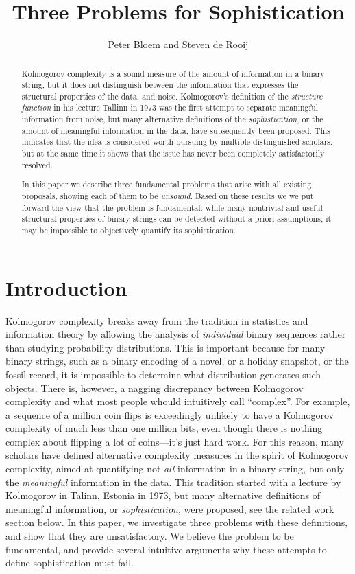 \documentclass{style/llncs}
\title{Three Problems for Sophistication}
\author{Peter Bloem and Steven de Rooij}
\institute{
  System and Network Engineering Group, \\University of Amsterdam, the Netherlands\\
  \email{uva@peterbloem.nl, steven.de.rooij@gmail.com}
}
\begin{document}
\maketitle

\begin{abstract}
Kolmogorov complexity is a sound measure of the amount of information in a binary string, but it does not distinguish between the information that expresses the structural properties of the data, and noise. Kolmogorov's definition of the \emph{structure function} in his lecture Tallinn in 1973 was the first attempt to separate meaningful information from noise, but many alternative definitions of the \emph{sophistication}, or the amount of meaningful information in the data, have subsequently been proposed. This indicates that the idea is considered worth pursuing by multiple distinguished scholars, but at the same time it shows that the issue has never been completely satisfactorily resolved.

In this paper we describe three fundamental problems that arise with all existing proposals, showing each of them to be \emph{unsound}. Based on these results we we put forward the view that the problem is fundamental: while many nontrivial and useful structural properties of binary strings can be detected without a priori assumptions, it may be impossible to objectively quantify its sophistication.
\end{abstract}

\section{Introduction}

Kolmogorov complexity breaks away from the tradition in statistics and information theory by allowing the analysis of \emph{individual} binary sequences rather than studying probability distributions. This is important because for many binary strings, such as a binary encoding of a novel, or a holiday snapshot, or the fossil record, it is impossible to determine what distribution generates such objects. There is, however, a nagging discrepancy between Kolmogorov complexity and what most people whould intuitively call ``complex''. For example, a sequence of a million coin flips is exceedingly unlikely to have a Kolmogorov complexity of much less than one million bits, even though there is nothing complex about flipping a lot of coins---it's just hard work. For this reason, many scholars have defined alternative complexity measures in the spirit of Kolmogorov complexity, aimed at quantifying not \emph{all} information in a binary string, but only the \emph{meaningful} information in the data. This tradition started with a lecture by Kolmogorov in Talinn, Estonia in 1973, but many alternative definitions of meaningful information, or \emph{sophistication}, were proposed, see the related work section below. In this paper, we investigate three problems with these definitions, and show that they are unsatisfactory. We believe the problem to be fundamental, and provide several intuitive arguments why these attempts to define sophistication must fail.
\end{document}
